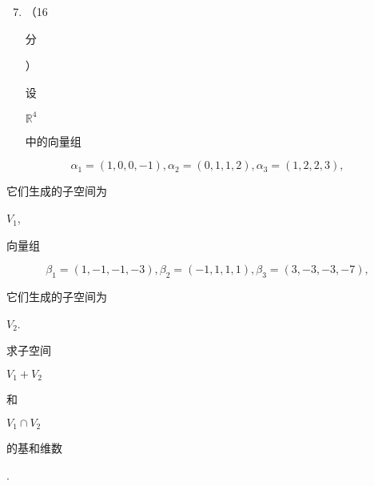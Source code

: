 \documentclass[10pt]{article}
\begin{document}
\begin{enumerate}
  \setcounter{enumi}{6}
  \item （16 \begin{CJK}{UTF8}{mj}分\end{CJK}） \begin{CJK}{UTF8}{mj}设\end{CJK} $\mathbb{R}^{4}$ \begin{CJK}{UTF8}{mj}中的向量组\end{CJK}
\end{enumerate}
$$
\alpha_{1}=(1,0,0,-1), \alpha_{2}=(0,1,1,2), \alpha_{3}=(1,2,2,3),
$$
\begin{CJK}{UTF8}{mj}它们生成的子空间为\end{CJK} $V_{1}$, \begin{CJK}{UTF8}{mj}向量组\end{CJK}
$$
\beta_{1}=(1,-1,-1,-3), \beta_{2}=(-1,1,1,1), \beta_{3}=(3,-3,-3,-7),
$$
\begin{CJK}{UTF8}{mj}它们生成的子空间为\end{CJK} $V_{2}$. \begin{CJK}{UTF8}{mj}求子空间\end{CJK} $V_{1}+V_{2}$ \begin{CJK}{UTF8}{mj}和\end{CJK} $V_{1} \cap V_{2}$ \begin{CJK}{UTF8}{mj}的基和维数\end{CJK}.
\end{document}
